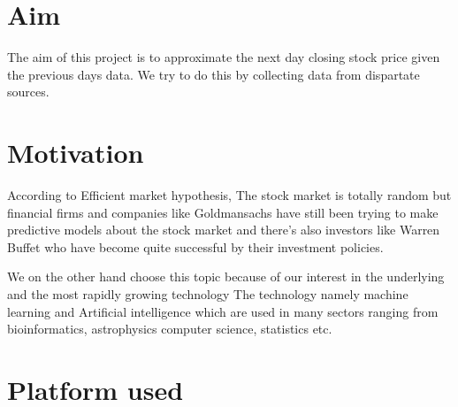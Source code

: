 \documentclass{report}
\begin{document}
 
\section{Aim}

The aim of this project is to approximate the next day closing stock price given the previous days data. We try to do this by collecting data from dispartate sources.
\newpage

\section{Motivation}

According to Efficient market hypothesis, The stock market is totally random but financial firms and companies like Goldmansachs have still been trying to make predictive models about the stock market and there's also investors like Warren Buffet who have become quite successful by their investment policies.\newline

We on the other hand choose this topic because of our interest in the underlying and the most rapidly growing technology The technology namely machine learning and Artificial intelligence which are used in many sectors ranging from bioinformatics, astrophysics computer science, statistics etc.   
\newpage
\section{Platform used}
\end{document}
